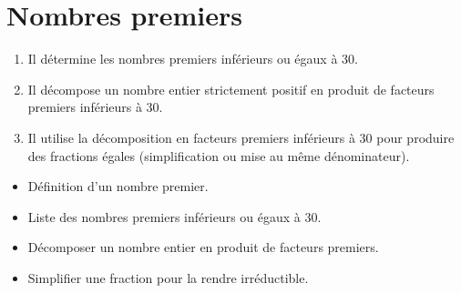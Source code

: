 \themaN
\graphicspath{{../../S23_Nombres_premiers/Images/}}

\chapter{Nombres premiers}
\label{S23}

\setlength{\doublerulesep}{0.3pt}


\begin{autoeval}
   \small
   \begin{enumerate}
      \item Il détermine les nombres premiers inférieurs ou égaux à 30.
      \item Il décompose un nombre entier strictement positif en produit de facteurs premiers inférieurs à 30.
      \item Il utilise la décomposition en facteurs premiers inférieurs à 30 pour produire des fractions égales (simplification ou mise au même dénominateur).
   \end{enumerate}
\end{autoeval}

\begin{prerequis}
   \begin{itemize}
      \item Définition d'un nombre premier.
      \item Liste des nombres premiers inférieurs ou égaux à 30.
      \item[\com] Décomposer un nombre entier en produit de facteurs premiers.
      \item[\com] Simplifier une fraction pour la rendre irréductible.
   \end{itemize}
\end{prerequis}

\vfill

